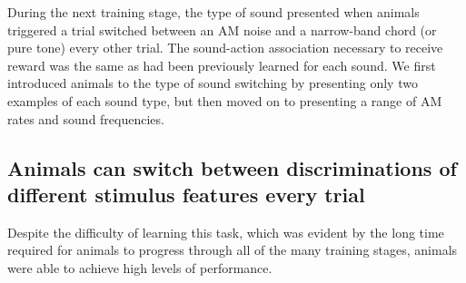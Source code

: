 During the next training stage, the type of sound presented when animals
triggered a trial switched between an AM noise and a narrow-band chord (or pure
tone) every other trial.
%
The sound-action association necessary to receive reward was the same as had
been previously learned for each sound.
%
We first introduced animals to the type of sound switching by presenting only
two examples of each sound type, but then moved on to presenting a range of AM
rates and sound frequencies.




\subsection{Animals can switch between discriminations of different stimulus
features every trial}

Despite the difficulty of learning this task, which was evident by the long
time required for animals to progress through all of the many training stages,
animals were able to achieve high levels of performance.

